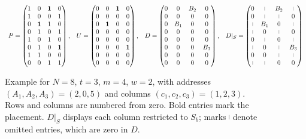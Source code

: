 \begin{figure}[H]
\centering
\setlength{\arraycolsep}{3pt}
\[
\begin{array}{cccc}
P =\begin{pmatrix}
1 & 0 & \mathbf{1} & 0 \\
1 & 0 & 0 &1 \\
0 & \mathbf{1} & 1 & 0 \\
0 & 1 & 0 & 1 \\
1 & 0 & 1 & 0 \\
0 & 1 & 0 & \mathbf{1} \\
1 & 1 & 0 & 0 \\
0 & 0 & 1 & 1 \\
\end{pmatrix},
&
U =
\begin{pmatrix}
0 & 0 & \mathbf{1} & 0 \\
0 & 0 & 0 & 0 \\
0 & \mathbf{1} & 0 & 0 \\
0 & 0 & 0 & 0 \\
0 & 0 & 0 & 0 \\
0 & 0 & 0 & \mathbf{1} \\
0 & 0 & 0 & 0 \\
0 & 0 & 0 & 0 \\
\end{pmatrix},
&
D =
\begin{pmatrix}
0 & 0 & B_2 & 0 \\
0 & 0 & 0 & 0 \\
0 & B_1 & 0 & 0 \\
0 & 0 & 0 & 0 \\
0 & 0 & 0 & 0 \\
0 & 0 & 0 & B_3 \\
0 & 0 & 0 & 0 \\
0 & 0 & 0 & 0 \\
\end{pmatrix},
&
D|_S =
\begin{pmatrix}
0 & \vbar & B_2 & \vbar \\
0 & \vbar & \vbar & 0 \\
\vbar & B_1 & 0 & \vbar \\
\vbar & 0 & \vbar & 0 \\
0 & \vbar & 0 & \vbar \\
\vbar & 0 & \vbar & B_3 \\
0 & 0 & \vbar & \vbar \\
\vbar & \vbar & 0 & 0 \\
\end{pmatrix}
\end{array}
\]
\caption{
Example for $N=8$, $t=3$, $m=4$, $w=2$, with addresses
$(A_1,A_2,A_3)=(2,0,5)$ and columns $(c_1,c_2,c_3)=(1,2,3)$.
Rows and columns are numbered from zero. Bold entries mark the placement.
$D|_S$ displays each column restricted to $S_b$; marks $\vbar$ denote
omitted entries, which are zero in $D$.
}
\label{fig:cuckoo-matrices}
\end{figure}


